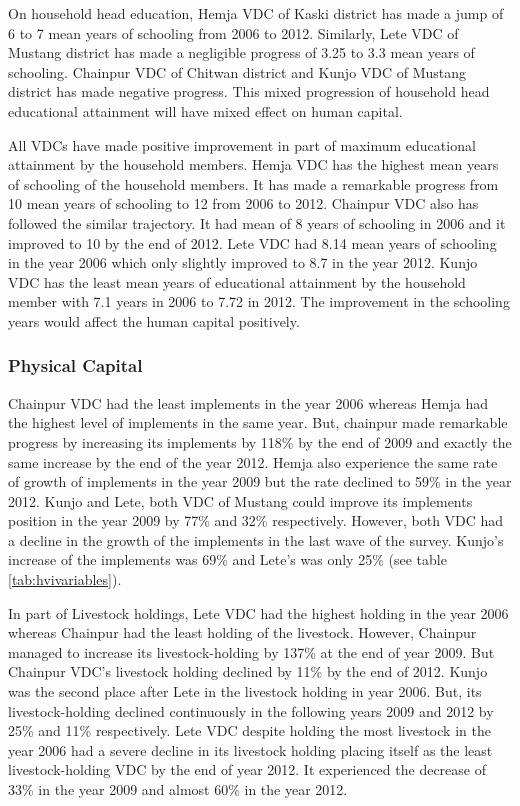 On household head education, Hemja VDC of Kaski district has made a jump of 6 to 7 mean years of schooling from 2006 to 2012. Similarly, Lete VDC of Mustang district has made a negligible progress of 3.25 to 3.3 mean years of schooling. Chainpur VDC of Chitwan district and Kunjo VDC of Mustang district has made negative progress. This mixed progression of household head educational attainment will have mixed effect on human capital.\par  

All VDCs have made positive improvement in part of maximum educational attainment by the household members. Hemja VDC has the highest mean years of schooling of the household members. It has made a remarkable progress from 10 mean years of schooling to 12 from 2006 to 2012. Chainpur VDC also has followed the similar trajectory. It had mean of 8 years of schooling in 2006 and it improved to 10 by the end of 2012. Lete VDC had 8.14 mean years of schooling in the year 2006 which only slightly improved to 8.7 in the year 2012. Kunjo VDC has the least mean years of educational attainment by the household member with 7.1 years in 2006 to 7.72 in 2012. The improvement in the schooling years would affect the human capital positively.\par 

\subsubsection{Physical Capital}
Chainpur VDC had the least implements in the year 2006 whereas Hemja had the highest level of implements in the same year. But, chainpur made remarkable progress by increasing its implements by 118\%  by the end of 2009 and exactly the same increase by the end of the year 2012. Hemja also experience the same rate of growth of implements in the year 2009 but the rate declined to 59\% in the year 2012. Kunjo and Lete, both VDC of Mustang could improve its implements position in the year 2009 by 77\% and 32\% respectively. However, both VDC had a decline in the growth of the implements in the last wave of the survey. Kunjo's increase of the implements was 69\% and Lete's was only 25\% (see table \ref{tab:hvivariables}).\par  

In part of Livestock holdings, Lete VDC had the highest holding in the year 2006 whereas Chainpur had the least holding of the livestock. However, Chainpur managed to increase its livestock-holding by 137\% at the end of year 2009. But Chainpur VDC's livestock holding declined by 11\% by the end of 2012. Kunjo was the second place after Lete in the livestock holding in year 2006. But, its livestock-holding declined continuously in the following years 2009 and 2012 by 25\% and 11\% respectively. Lete VDC despite holding the most livestock in the year 2006 had a severe decline in its livestock holding placing itself as the least livestock-holding VDC by the end of year 2012. It experienced the decrease of 33\% in the year 2009 and almost 60\% in the year 2012.\par  

